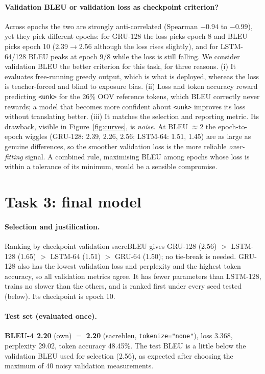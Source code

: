 \documentclass[10pt,a4paper]{article}
\newcommand{\code}[1]{\texttt{#1}}
\begin{document}
\paragraph{Validation BLEU or validation loss as checkpoint criterion?} Across epochs the two are strongly
anti-correlated (Spearman $-0.94$ to $-0.99$), yet they pick different epochs: for GRU-128 the loss picks
epoch 8 and BLEU picks epoch 10 (2.39$\to$2.56 although the loss rises slightly), and for LSTM-64/128
BLEU peaks at epoch 9/8 while the loss is still falling. We consider validation BLEU the better criterion for
this task, for three reasons. (i) It evaluates free-running greedy output, which is what is deployed, whereas
the loss is teacher-forced and blind to exposure bias. (ii) Loss and token accuracy reward predicting
\code{<unk>} for the 26\% OOV reference tokens, which BLEU correctly never rewards; a model that becomes more
confident about \code{<unk>} improves its loss without translating better. (iii) It matches the selection and
reporting metric. Its drawback, visible in Figure~\ref{fig:curves}, is \emph{noise}. At BLEU $\approx2$ the
epoch-to-epoch wiggles (GRU-128: 2.39, 2.26, 2.56; LSTM-64: 1.51, 1.45) are as large as genuine differences,
so the smoother validation loss is the more reliable \emph{over-fitting} signal. A combined rule, maximising
BLEU among epochs whose loss is within a tolerance of its minimum, would be a sensible compromise.

\section{Task 3: final model}

\paragraph{Selection and justification.} Ranking by checkpoint validation sacreBLEU gives GRU-128 (2.56)
$>$ LSTM-128 (1.65) $>$ LSTM-64 (1.51) $>$ GRU-64 (1.50); no tie-break is needed. GRU-128 also has the lowest
validation loss and perplexity and the highest token accuracy, so all validation metrics agree. It has
fewer parameters than LSTM-128, trains no slower than the others, and is ranked first under every seed tested
(below). Its checkpoint is epoch 10.

\paragraph{Test set (evaluated once).} \textbf{BLEU-4 2.20} (own) $=$ \textbf{2.20} (sacrebleu,
\code{tokenize="none"}), loss 3.368, perplexity 29.02, token accuracy 48.45\%. The test BLEU is a little below
the validation BLEU used for selection (2.56), as expected after choosing the maximum of 40 noisy validation
measurements.
\end{document}
